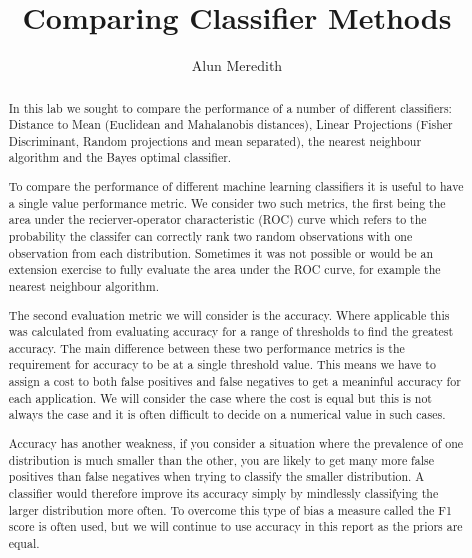 \documentclass[a4paper,11pt, twocolumn]{article}
\begin{document}
\title{Comparing Classifier Methods}
\author{Alun Meredith}
\maketitle
\begin{abstract}
In this lab we sought to compare the performance of a number of different classifiers: Distance to Mean (Euclidean and Mahalanobis distances), Linear Projections (Fisher Discriminant, Random projections and mean separated), the nearest neighbour algorithm and the Bayes optimal classifier. 

To compare the performance of different machine learning classifiers it is useful to have a single value performance metric. We consider two such metrics, the first being the area under the recierver-operator characteristic (ROC) curve which refers to the probability the classifer can correctly rank two random observations with one observation from each distribution. Sometimes it was not possible or would be an extension exercise to fully evaluate the area under the ROC curve, for example the nearest neighbour algorithm. 

The second evaluation metric we will consider is the accuracy. Where applicable this was calculated from evaluating accuracy for a range of thresholds to find the greatest accuracy. The main difference between these two performance metrics is the requirement for accuracy to be at a single threshold value. This means we have to assign a cost to both false positives and false negatives to get a meaninful accuracy for each application. We will consider the case where the cost is equal but this is not always the case and it is often difficult to decide on a numerical value in such cases.

Accuracy has another weakness, if you consider a situation where the prevalence of one distribution is much smaller than the other, you are likely to get many more false positives than false negatives when trying to classify the smaller distribution. A classifier would therefore improve its accuracy simply by mindlessly classifying the larger distribution more often. To overcome this type of bias a measure called the F1 score is often used, but we will continue to use accuracy in this report as the priors are equal.


\end{abstract}
\end{document}
